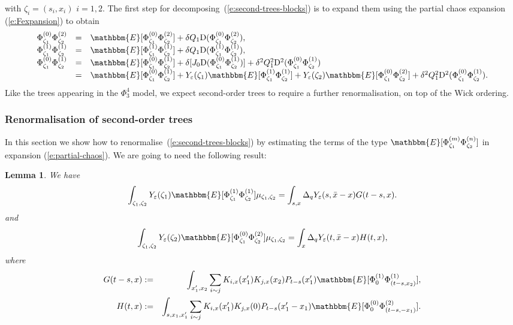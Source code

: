 \documentclass[a4paper,11pt]{article}
\newcommand{\assign}{:=}
\newcommand{\mathD}{\mathrm{D}}
\newtheorem{lemma}[theorem]{Lemma}
{\theorembodyfont{\rmfamily}\newtheorem{remark}[theorem]{Remark}}
\begin{document}
with $\zeta_i = (s_i, x_i)$ $i = 1, 2$. The first step for
decomposing~(\ref{e:second-trees-blocks}) is to expand them using the partial
chaos expansion (\ref{e:Fexpansion}) to obtain
\begin{equation}
  \begin{array}{lll}
    \Phi^{(0)}_{\zeta_1} \Phi^{(2)}_{\zeta_2} & = & \mathbbm{E}
    [\Phi^{(0)}_{\zeta_1} \Phi^{(2)}_{\zeta_2}] + \delta Q_1 \mathD
    (\Phi^{(0)}_{\zeta_1} \Phi^{(2)}_{\zeta_2}),\\
    \Phi^{(1)}_{\zeta_1} \Phi^{(1)}_{\zeta_2} & = & \mathbbm{E}
    [\Phi^{(1)}_{\zeta_1} \Phi^{(1)}_{\zeta_2}] + \delta Q_1 \mathD
    (\Phi^{(1)}_{\zeta_1} \Phi^{(1)}_{\zeta_2}),\\
    \Phi^{(0)}_{\zeta_1} \Phi_{\zeta_2}^{(1)} & = & \mathbbm{E}
    [\Phi^{(0)}_{\zeta_1} \Phi^{(1)}_{\zeta_2}] + \delta [J_0 \mathD
    (\Phi^{(0)}_{\zeta_1} \Phi^{(1)}_{\zeta_2})] + \delta^2 Q_1^2 \mathD^2
    (\Phi^{(0)}_{\zeta_1} \Phi^{(1)}_{\zeta_2})\\
    & = & \mathbbm{E} [\Phi^{(0)}_{\zeta_1} \Phi^{(1)}_{\zeta_2}] +
    Y_{\varepsilon} (\zeta_1) \mathbbm{E} [\Phi^{(1)}_{\zeta_1}
    \Phi^{(1)}_{\zeta_2}] + Y_{\varepsilon} (\zeta_2) \mathbbm{E}
    [\Phi^{(0)}_{\zeta_1} \Phi^{(2)}_{\zeta_2}] + \delta^2 Q_1^2 \mathD^2
    (\Phi^{(0)}_{\zeta_1} \Phi^{(1)}_{\zeta_2}) .
  \end{array} \label{e:partial-chaos}
\end{equation}
Like the trees appearing in the $\Phi^4_3$ model, we expect second-order trees
to require a further renormalisation, on top of the Wick ordering.

\subsubsection{Renormalisation of second-order trees}

In this section we show how to renormalise~(\ref{e:second-trees-blocks}) by
estimating the terms of the type $\mathbbm{E} [\Phi^{(m)}_{\zeta_1}
\Phi^{(n)}_{\zeta_2}]$ in expansion (\ref{e:partial-chaos}). We are going to
need the following result:

\begin{lemma}
  We have
  \[ \int_{\zeta_1, \zeta_2} Y_{\varepsilon} (\zeta_1) \mathbbm{E}
     [\Phi^{(1)}_{\zeta_1} \Phi^{(1)}_{\zeta_2}] \mu_{\zeta_1, \zeta_2} =
     \int_{s, x} \Delta_q Y_{\varepsilon} (s, \bar{x} - x) G (t - s, x) . \]
  and
  \[ \int_{\zeta_1, \zeta_2} Y_{\varepsilon} (\zeta_2) \mathbbm{E}
     [\Phi^{(0)}_{\zeta_1} \Phi^{(2)}_{\zeta_2}] \mu_{\zeta_1, \zeta_2} =
     \int_x \Delta_q Y_{\varepsilon} (t, \bar{x} - x) H (t, x), \]
  where
  \begin{eqnarray*}
    G (t - s, x) & \assign & \int_{x_1', x_2}  \sum_{i \sim j} K_{i, x} (x_1')
    K_{j, x} (x_2) P_{t - s} (x_1') \mathbbm{E} [\Phi^{(1)}_0 \Phi^{(1)}_{(t -
    s, x_2)}],\\
    H (t, x) & \assign & \int_{s, x_1, x_1'}  \sum_{i \sim j} K_{i, x} (x_1')
    K_{j, x} (0) P_{t - s} (x_1' - x_1) \mathbbm{E} [\Phi^{(0)}_0
    \Phi^{(2)}_{(t - s, - x_1)}] .
  \end{eqnarray*}
\end{lemma}
\end{document}
